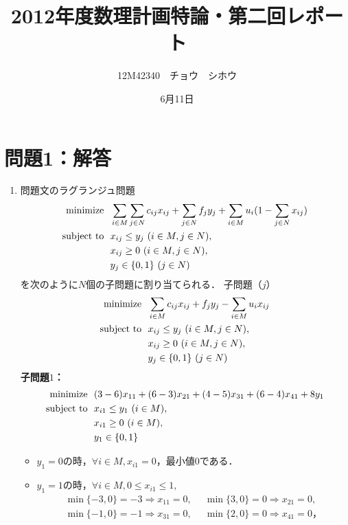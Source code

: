 \documentclass[a4paper,11pt]{jsarticle}
\title{2012年度数理計画特論・第二回レポート}
\author{12M42340　チョウ　シホウ}
\date{6月11日}
\numberwithin{theorem}{section}  %
\numberwithin{equation}{section} %
\newcommand{\minimize}{\mathop{\mathrm{\rm minimize}}\limits}
\begin{document}
{}
\renewcommand{\thepart}{\arabic{part}}


\section{問題1：解答}
\begin{enumerate}
\item 問題文のラグランジュ問題
\[
\begin{split}
\minimize &\,\,\,\,  \sum_{i \in M} \sum_{j \in N} c_{ij}x_{ij} + \sum_{j \in N} f_j y_j + \sum_{i \in M} u_i(1-\sum_{j\in N}x_{ij})\\
\text{subject to} &\,\,\,\,  x_{ij} \le y_j \,\, (i \in M, j \in N),\\
&\,\,\,\,  x_{ij} \ge 0  \,\, (i \in M, j \in N),\\
&\,\,\,\,  y_j \in \{0,1\} \,\, (j \in N)
\end{split}
\]
を次のように$N$個の子問題に割り当てられる．
子問題（$j$）
\[
\begin{split}
\minimize &\,\,\,\, \sum_{i \in M} c_{ij}x_{ij} + f_jy_j - \sum_{i \in M} u_i x_{ij} \\
\text{subject to} &\,\,\,\,  x_{ij} \le y_j \,\, (i \in M, j \in N),\\
&\,\,\,\,  x_{ij} \ge 0  \,\, (i \in M, j \in N),\\
&\,\,\,\,  y_j \in \{0,1\} \,\, (j \in N)
\end{split}
\]
{\bf 子問題$1$：}
\[
\begin{split}
\minimize &\,\,\,\, (3-6)x_{11} + (6-3)x_{21} + (4-5)x_{31} + (6-4)x_{41} +8y_1 \\
\text{subject to} &\,\,\,\,  x_{i1} \le y_1 \,\, (i \in M),\\
&\,\,\,\,  x_{i1} \ge 0  \,\, (i \in M),\\
&\,\,\,\,  y_1 \in \{0,1\}
\end{split}
\]
\begin{itemize}
\item $y_1 = 0$の時，$\forall i \in M, x_{i1}=0$，最小値$0$である．
\item $y_1 = 1$の時，$\forall i \in M, 0 \le x_{i1} \le 1, $ 
\[\begin{split}
\min \{-3,0\} = -3 \Rightarrow x_{11} = 0, &\,\,\, \min \{3,0\} = 0 \Rightarrow x_{21} = 0,\\ \min \{-1,0\} = -1 \Rightarrow x_{31} = 0, &\,\,\, \min \{2,0\} = 0 \Rightarrow x_{41} = 0，

\end{split}\]
\end{itemize}
\end{enumerate}
\end{document}
